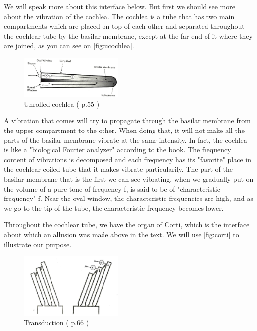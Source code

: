 We will speak more about this interface below. But first we should see 
more about the vibration of the cochlea. 
The cochlea is a tube that has two main compartments which are placed on top of 
each other and separated throughout the cochlear tube by  
the basilar membrane,  except at the far end of it where they are joined, 
as you can see on \autoref{fig:ucochlea}.


\begin{figure}[h]
	\centering
	\includegraphics[width=0.45\textwidth]{images/cochlea-aud55-level.jpg}
	\caption{Unrolled cochlea (\cite{AuditoryNeuroscience} p.55 )}
	\label{fig:ucochlea}
\end{figure}


A vibration that comes will try to propagate through the basilar membrane from 
the upper compartment to the other. When doing that, it will not make all 
the parts of the basilar membrane vibrate at the same intensity. 
In fact, the cochlea is like a "biological Fourier analyzer" according to the book. 
The frequency content of vibrations is decomposed and each frequency has its 
"favorite" place in the cochlear coiled tube that it makes vibrate particularily. 
The part of the basilar membrane that is the first we can see vibrating, 
when we gradually put on the volume of a pure tone of frequency f, is said to be of 
"characteristic frequency" f. Near the oval window, the characteristic 
frequencies are high, and as we go to the tip of the tube, 
the characteristic frequency becomes lower.

Throughout the cochlear tube, we have the organ of Corti, which is the interface
about which an allusion was made above in the text. We will use \autoref{fig:corti} to illustrate our purpose.


\begin{figure}[h]
	\centering
  \includegraphics[width=0.45\textwidth]{images/hctransd-aud66-level.jpg}
	\caption{Transduction (\cite{AuditoryNeuroscience} p.66 )}
	\label{fig:transd}
\end{figure}


